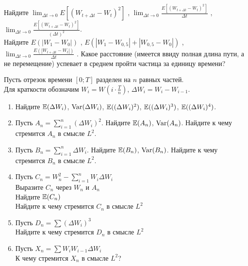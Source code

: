 \begin{problem}
Найдите $\lim_{\Delta t \to 0} E\left[ {\left( {W_{t + \Delta t} -
W_t } \right)^2 } \right]$ , $\lim_{\Delta t \to 0} \frac{{E\left[
{\left( {W_{t + \Delta t} - W_t } \right)^2 } \right]}} {{\Delta
t}}$ , $\lim_{\Delta t \to 0} \frac{{E\left[ {\left( {W_{t +
\Delta t} - W_t } \right)^2 } \right]}} {{\left( {\Delta t}
\right)^2 }}$. \\
Найдите $E\left( {\left| {W_1  - W_0 } \right|} \right)$ ,
$E\left( {\left| {W_1  - W_{0,5} } \right| + \left| {W_{0,5}  -
W_0 } \right|} \right)$ , $\lim_{\Delta t \to 0} \frac{{E\left(
{\left| {W_{t + \Delta t} - W_t } \right|} \right)}} {{\Delta t}}$
. Какое расстояние (имеется ввиду полная длина пути, а не
перемещение) успевает в среднем пройти частица за единицу времени?

\begin{sol}

\end{sol}
\end{problem}

\begin{problem}
Пусть отрезок времени $[0;T]$ разделен на $n$ равных частей. \\
Для краткости обозначим $W_{i}=W(i\cdot \frac{T}{n})$, $\Delta W_{i}=W_{i}-W_{i-1}$.
\begin{enumerate}
\item Найдите $\mathbb{E}(\Delta W_{i})$, $\operatorname{Var}(\Delta W_{i})$, $\mathbb{E}((\Delta W_{i})^{2})$, $\mathbb{E}((\Delta W_{i})^{3})$, $\mathbb{E}((\Delta W_{i})^{4})$.
\item Пусть $A_{n}=\sum_{i=1}^{n}(\Delta W_{i})^{2}$. Найдите $\mathbb{E}(A_{n})$, $\operatorname{Var}(A_{n})$. Найдите к чему стремится $A_{n}$ в смысле $L^{2}$.
\item Пусть $B_{n}=\sum_{i=1}^{n}\Delta W_{i}$. Найдите $\mathbb{E}(B_{n})$, $\operatorname{Var}(B_{n})$. Найдите к чему стремится $B_{n}$ в смысле $L^{2}$.
\item Пусть $C_{n}=W_{n}^{2}-\sum_{i=1}^{n}W_{i}\Delta W_{i}$ \\
Выразите $C_{n}$ через $W_{n}$ и $A_{n}$ \\
Найдите $\mathbb{E}(C_{n})$ \\
Найдите к чему стремится $C_{n}$ в смысле $L^{2}$ \\
\item Пусть $D_{n}=\sum (\Delta W_{i})^{3}$ \\
Найдите к чему стремится $D_{n}$ в смысле $L^{2}$ \\
\item Пусть $X_{n}=\sum W_{i}W_{i-1}\Delta W_{i}$ \\
К чему стремится $X_{n}$ в смысле $L^{2}$?
\end{enumerate}

\begin{sol}

\end{sol}
\end{problem}

